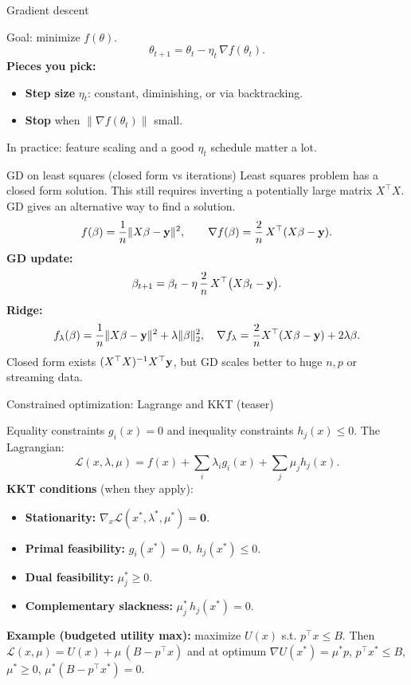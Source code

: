 \documentclass[11pt,aspectratio=169]{beamer}
\begin{document}
\begin{frame}{Gradient descent }

Goal: minimize \(f(\theta)\).
\[
\theta_{t+1}=\theta_t-\eta_t\,\nabla f(\theta_t).
\]
\textbf{Pieces you pick:}
\begin{itemize}
\item \textbf{Step size} \(\eta_t\): constant, diminishing, or via backtracking.
\item \textbf{Stop} when \(\|\nabla f(\theta_t)\|\) small.
\end{itemize}
{\footnotesize In practice: feature scaling and a good \(\eta_t\) schedule matter a lot.}

\end{frame}

\begin{frame}{GD on least squares (closed form vs iterations)}
Least squares problem has a closed form solution. This still requires inverting a potentially large matrix $X^\top X$. GD gives an alternative  way to find a solution. 
\[
f(\beta)=\frac{1}{n}\|X\beta-{\bf y}\|^2,\qquad
\nabla f(\beta)=\frac{2}{n}\,X^{\top}(X\beta-{\bf y}).
\]
\textbf{GD update:}
\[
\beta_{t+1}=\beta_t-\eta\,\frac{2}{n}\,X^{\top}\big(X\beta_t-{\bf y}\big).
\]
\textbf{Ridge:}
\[
f_{\lambda}(\beta)=\frac{1}{n}\|X\beta-{\bf y}\|^2+\lambda\|\beta\|_2^2,\quad
\nabla f_{\lambda}=\frac{2}{n}X^{\top}(X\beta-{\bf y})+2\lambda\beta.
\]
{\footnotesize Closed form exists \((X^{\top}X)^{-1}X^{\top}{\bf y}\), but GD scales better to huge \(n,p\) or streaming data.}

\end{frame}


\begin{frame}{Constrained optimization: Lagrange and KKT (teaser)}

Equality constraints \(g_i(x)=0\) and inequality constraints \(h_j(x)\le 0\).
The Lagrangian:
\[
\mathcal{L}(x,\lambda,\mu)=f(x)+\sum_i \lambda_i g_i(x)+\sum_j \mu_j h_j(x).
\]
\textbf{KKT conditions} (when they apply):
\begin{itemize}
\item \textbf{Stationarity: } \(\nabla_x \mathcal{L}(x^*,\lambda^*,\mu^*)=\mathbf{0}\).
\item \textbf{Primal feasibility: } \(g_i(x^*)=0,\; h_j(x^*)\le 0\).
\item \textbf{Dual feasibility: } \(\mu_j^*\ge 0\).
\item \textbf{Complementary slackness: } \(\mu_j^*\,h_j(x^*)=0\).
\end{itemize}
\textbf{Example (budgeted utility max):} maximize \(U(x)\) s.t. \(p^{\top}x\le B\).
Then \(\mathcal{L}(x,\mu)=U(x)+\mu\,(B-p^{\top}x)\) and at optimum
\(\nabla U(x^*)=\mu^* p\), \(p^{\top}x^*\le B\), \(\mu^*\ge 0\), \(\mu^*(B-p^{\top}x^*)=0\).

\end{frame}
\end{document}
